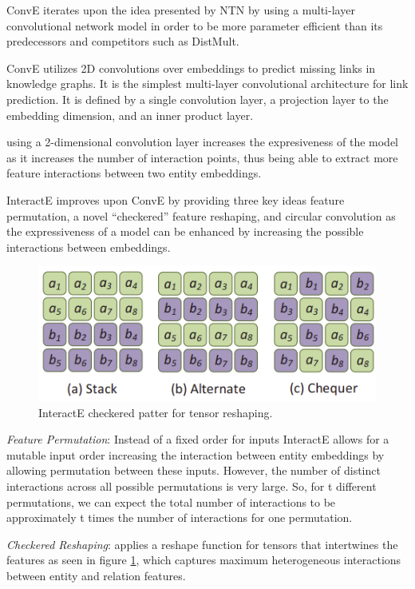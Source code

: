 ConvE \cite{} iterates upon the idea presented by NTN by using a multi-layer convolutional network model in order to be more parameter efficient than its predecessors and competitors such as DistMult. 

ConvE utilizes 2D convolutions over embeddings to predict missing links in knowledge graphs. It is the simplest multi-layer convolutional architecture for link  prediction. It is defined by a single convolution layer, a projection layer to the embedding dimension, and an inner product layer.

using a 2-dimensional convolution layer increases the expresiveness of the model as it increases the number of interaction points, thus being able to extract more feature interactions between two entity embeddings.

InteractE \cite{} improves upon ConvE by providing three key ideas feature permutation, a novel ``checkered'' feature reshaping, and circular convolution as the expressiveness of a model can be enhanced by increasing the possible interactions between embeddings.

\begin{figure}[!ht]
    \centering
    \includegraphics[width=.65\textwidth]{fig/embeddings/InteractE.png}
    \caption{InteractE checkered patter for tensor reshaping.}
    \label{fig:emb-interactE}
\end{figure}

\textit{Feature Permutation}: Instead of a fixed order for inputs InteractE allows for a mutable input order increasing the interaction between entity embeddings by allowing permutation between these inputs. However, the number of distinct interactions across all possible permutations is very large. So, for t different permutations, we can expect the total number of interactions to be approximately t times the number of interactions for one permutation.

\textit{Checkered Reshaping}: applies a reshape function for tensors that intertwines the features as seen in figure \ref{fig:emb-interactE}, which captures maximum heterogeneous interactions between entity and relation features.

